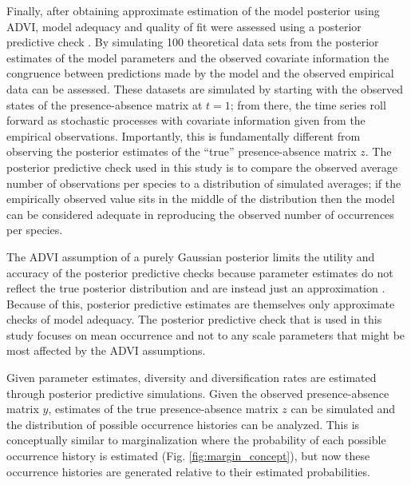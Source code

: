 \documentclass[12pt,letterpaper]{article}
\begin{document}
Finally, after obtaining approximate estimation of the model posterior using ADVI, model adequacy and quality of fit were assessed using a posterior predictive check \citep{Gelman2013d}. By simulating 100 theoretical data sets from the posterior estimates of the model parameters and the observed covariate information the congruence between predictions made by the model and the observed empirical data can be assessed. These datasets are simulated by starting with the observed states of the presence-absence matrix at \(t = 1\); from there, the time series roll forward as stochastic processes with covariate information given from the empirical observations. Importantly, this is fundamentally different from observing the posterior estimates of the ``true'' presence-absence matrix \(z\). The posterior predictive check used in this study is to compare the observed average number of observations per species to a distribution of simulated averages; if the empirically observed value sits in the middle of the distribution then the model can be considered adequate in reproducing the observed number of occurrences per species. 

The ADVI assumption of a purely Gaussian posterior limits the utility and accuracy of the posterior predictive checks because parameter estimates do not reflect the true posterior distribution and are instead just an approximation \citep{Gelman2013d}. Because of this, posterior predictive estimates are themselves only approximate checks of model adequacy. The posterior predictive check that is used in this study focuses on mean occurrence and not to any scale parameters that might be most affected by the ADVI assumptions.


Given parameter estimates, diversity and diversification rates are estimated through posterior predictive simulations. Given the observed presence-absence matrix \(y\), estimates of the true presence-absence matrix \(z\) can be simulated and the distribution of possible occurrence histories can be analyzed. This is conceptually similar to marginalization where the probability of each possible occurrence history is estimated (Fig. \ref{fig:margin_concept}), but now these occurrence histories are generated relative to their estimated probabilities.
\end{document}
